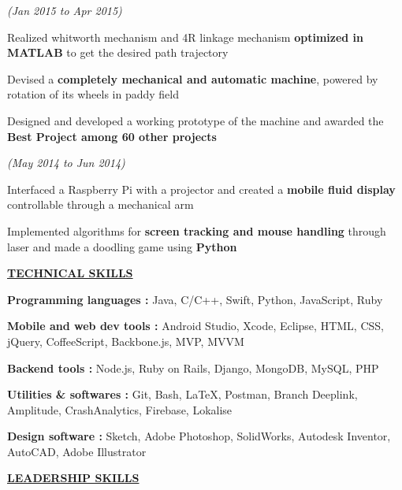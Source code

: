 \documentclass[a4paper]{deedy-resume} %
\begin{document}
\hfill {\textit{\small(Jan 2015 to Apr 2015)}}\\
\begin{tightitemize}
\item Realized whitworth mechanism and 4R linkage mechanism \textbf{optimized in MATLAB}  to get the desired path trajectory
\item Devised a \textbf{completely mechanical and automatic machine}, powered by rotation of its wheels in paddy field
\item Designed and developed a working prototype of the machine and awarded the \textbf{Best Project among 60 other projects}
\end{tightitemize}


\microspace

\hfill {\textit{\small(May 2014 to Jun 2014)}}\\

\begin{tightitemize}
\item Interfaced a Raspberry Pi with a projector and created a \textbf{mobile fluid display} controllable through a mechanical arm
\item Implemented algorithms for \textbf{screen tracking and mouse handling} through  laser and made a doodling game using \textbf{Python}
\end{tightitemize}
\sectionspace

{\uppercase\uline{\textbf{\large{Technical Skills}}\hfill}}
\microspace
\begin{tightitemize}
\item \textbf{Programming languages \hspace{10pt}:  } Java, C/C++, Swift, Python, JavaScript, Ruby
\item \textbf{Mobile and web dev tools   \hspace{1pt} : } Android Studio, Xcode, Eclipse, HTML, CSS, jQuery, CoffeeScript, Backbone.js, MVP, MVVM 
\item \textbf{Backend tools  \hspace{51pt} : }   Node.js, Ruby on Rails, Django, MongoDB, MySQL, PHP
\item \textbf{Utilities \& softwares \hspace{27pt}: } Git, Bash, \LaTeX, Postman, Branch Deeplink, Amplitude, CrashAnalytics, Firebase, Lokalise
\item \textbf{Design software \hspace{45pt}: } Sketch, Adobe Photoshop, SolidWorks, Autodesk Inventor, AutoCAD, Adobe Illustrator
\end{tightitemize}
\sectionspace
{\uppercase\uline{\textbf{\large{Leadership Skills}}\hfill}}
\end{document}
